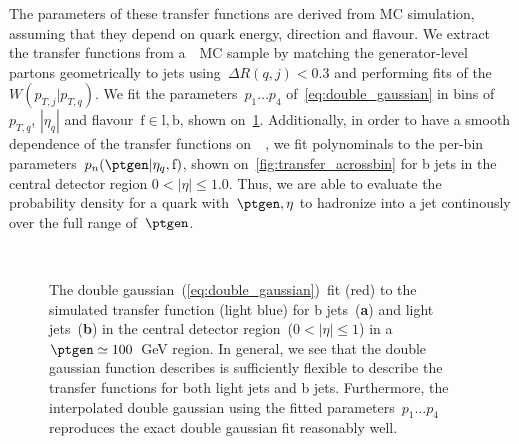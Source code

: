 The parameters of these transfer functions are derived from MC simulation, assuming that they depend on quark energy, direction and flavour. We extract the transfer functions from a~\ttbar~MC sample by matching the generator-level partons geometrically to jets using~$\Delta R(q,j) < 0.3$ and performing fits of the~$W(p_{T,j}|p_{T,q})$. We fit the parameters~$p_1 \dots p_4$ of~\cref{eq:double_gaussian} in bins of~$p_{T,q}$, $|\eta_{q}|$ and flavour~$\mathrm{f}\in{\mathrm{l}, \mathrm{b}}$, shown on~\cref{fig:transfer_perbin}. Additionally, in order to have a smooth dependence of the transfer functions on~\ptgen~, we fit polynominals to the per-bin parameters~$p_n(\ptgen|\eta_{q},\mathrm{f})$, shown on~\cref{fig:transfer_acrossbin} for b jets in the central detector region $0 < |\eta| \le 1.0$. Thus, we are able to evaluate the probability density for a quark with~$\ptgen,\eta$ to hadronize into a jet continously over the full range of~$\ptgen$.

\begin{figure}
\begin{centering}
 \\
\caption{The double gaussian~(\cref{eq:double_gaussian})~fit (red) to the simulated transfer function (light blue) for b jets~(\textbf{a}) and light jets~(\textbf{b}) in the central detector region~($0 < |\eta| \le 1$) in a~$\ptgen \simeq 100$~GeV region. In general, we see that the double gaussian function describes is sufficiently flexible to describe the transfer functions for both light jets and b jets. Furthermore, the interpolated double gaussian using the fitted parameters~$p_1 \dots p_4$ reproduces the exact double gaussian fit reasonably well.}
\label{fig:transfer_perbin}
\end{centering}
\end{figure}

